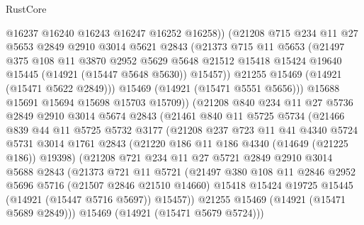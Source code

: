 \begin{lexlean}{RustCore}
\begin{coremodule}
                @16237
                @16240
                @16243
                @16247
                @16252
                @16258))
            (@21208
              @715
              @234
              @11
              @27
              @5653
              @2849
              @2910
              @3014
              @5621
              @2843
              (@21373
                @715
                @11
                @5653
                (@21497
                  @375
                  @108
                  @11
                  @3870
                  @2952
                  @5629
                  @5648
                  @21512
                  @15418
                  @15424
                  @19640
                  @15445
                  (@14921 (@15447 @5648 @5630))
                  @15457))
              @21255
              @15469
              (@14921 (@15471 @5622 @2849)))
            @15469
            (@14921 (@15471 @5551 @5656)))
          @15688
          @15691
          @15694
          @15698
          @15703
          @15709))
      (@21208
        @840
        @234
        @11
        @27
        @5736
        @2849
        @2910
        @3014
        @5674
        @2843
        (@21461
          @840
          @11
          @5725
          @5734
          (@21466
            @839
            @44
            @11
            @5725
            @5732
            @3177
            (@21208
              @237
              @723
              @11
              @41
              @4340
              @5724
              @5731
              @3014
              @1761
              @2843
              (@21220 @186 @11 @186 @4340 (@14649 (@21225 @186)) @19398)
              (@21208
                @721
                @234
                @11
                @27
                @5721
                @2849
                @2910
                @3014
                @5688
                @2843
                (@21373
                  @721
                  @11
                  @5721
                  (@21497
                    @380
                    @108
                    @11
                    @2846
                    @2952
                    @5696
                    @5716
                    (@21507 @2846 @21510 @14660)
                    @15418
                    @15424
                    @19725
                    @15445
                    (@14921 (@15447 @5716 @5697))
                    @15457))
                @21255
                @15469
                (@14921 (@15471 @5689 @2849)))
              @15469
              (@14921 (@15471 @5679 @5724)))

\end{coremodule}
\end{lexlean}
